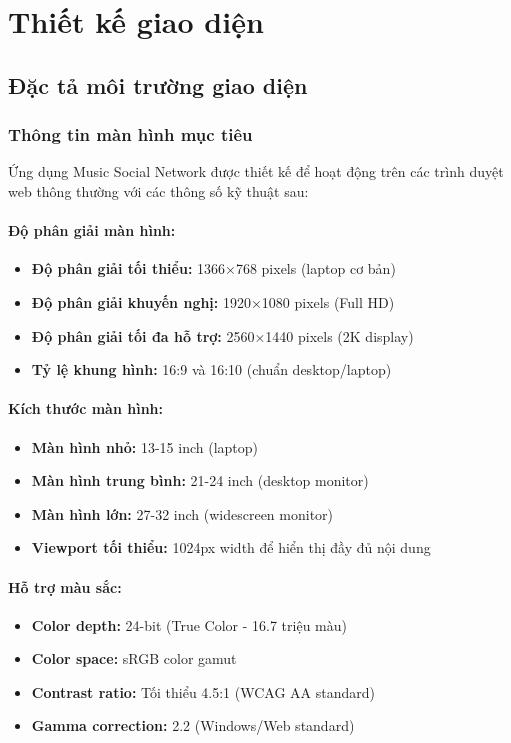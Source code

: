 \section{Thiết kế giao diện}

\subsection{Đặc tả môi trường giao diện}

\subsubsection{Thông tin màn hình mục tiêu}

Ứng dụng Music Social Network được thiết kế để hoạt động trên các trình duyệt web thông thường với các thông số kỹ thuật sau:

\paragraph{Độ phân giải màn hình:}
\begin{itemize}
    \item \textbf{Độ phân giải tối thiểu:} 1366×768 pixels (laptop cơ bản)
    \item \textbf{Độ phân giải khuyến nghị:} 1920×1080 pixels (Full HD)
    \item \textbf{Độ phân giải tối đa hỗ trợ:} 2560×1440 pixels (2K display)
    \item \textbf{Tỷ lệ khung hình:} 16:9 và 16:10 (chuẩn desktop/laptop)
\end{itemize}

\paragraph{Kích thước màn hình:}
\begin{itemize}
    \item \textbf{Màn hình nhỏ:} 13-15 inch (laptop)
    \item \textbf{Màn hình trung bình:} 21-24 inch (desktop monitor)
    \item \textbf{Màn hình lớn:} 27-32 inch (widescreen monitor)
    \item \textbf{Viewport tối thiểu:} 1024px width để hiển thị đầy đủ nội dung
\end{itemize}

\paragraph{Hỗ trợ màu sắc:}
\begin{itemize}
    \item \textbf{Color depth:} 24-bit (True Color - 16.7 triệu màu)
    \item \textbf{Color space:} sRGB color gamut
    \item \textbf{Contrast ratio:} Tối thiểu 4.5:1 (WCAG AA standard)
    \item \textbf{Gamma correction:} 2.2 (Windows/Web standard)
\end{itemize}

